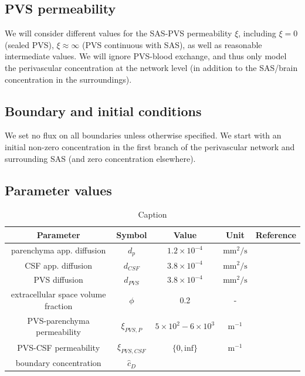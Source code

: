 \documentclass[fleqn,10pt]{wlscirep}
\begin{document}
\subsection*{PVS permeability}
We will consider different values for the SAS-PVS permeability $\xi$, including $\xi = 0$ (sealed PVS), $\xi \approx \infty$ (PVS continuous with SAS), as well as reasonable intermediate values. We will ignore PVS-blood exchange, and thus only model the perivascular concentration at the network level (in addition to the SAS/brain concentration in the surroundings).  

\subsection*{Boundary and initial conditions}
We set no flux on all boundaries unless otherwise specified. We start with an initial non-zero concentration in the first branch of the perivascular network and surrounding SAS (and zero concentration elsewhere).


\subsection*{Parameter values}


\begin{table}
    \centering
    \begin{tabular}{|c|c|c|c|c|} \hline 
 Parameter& Symbol& Value& Unit&Reference\\ \hline 
         parenchyma app. diffusion&  $d_p$&  $1.2 \times 10^{-4}$& $\text{mm}^2/\text{s}$  & \cite{valnes2020apparent}\\\hline 
         CSF app. diffusion&  $d_{CSF}$&  $3.8 \times 10^{-4}$& $\text{mm}^2/\text{s}$ & \cite{valnes2020apparent}\\\hline 
         PVS diffusion&  $d_{PVS}$&  $3.8 \times 10^{-4}$& $\text{mm}^2/\text{s}$ & \cite{valnes2020apparent}\\\hline 
         extracellular space volume fraction& $\phi$& 0.2& - &\cite{nicholson1981ion} \\\hline 
         PVS-parenchyma permeability&  $\xi_{PVS,P}$& $5 \times 10^{2} - 6 \times 10^{3} $  & $\text{m}^{-1}$ & \cite{koch2023estimates} \\\hline 
         PVS-CSF permeability&  $\xi_{PVS,CSF}$& $\{0, \text{inf}\}$ & $\text{m}^{-1}$ & \\ \hline 
 boundary concentration& $\hat{c}_D$& & &\\ \hline
    \end{tabular}
    \caption{Caption}
    \label{tab:parameters}
\end{table}
\end{document}
